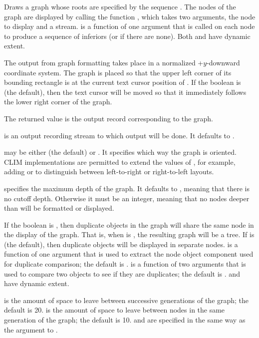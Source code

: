 Draws a graph whose roots are specified by the sequence .  The
nodes of the graph are displayed by calling the function ,
which takes two arguments, the node to display and a stream.
 is a function of one argument that is called on each
node to produce a sequence of inferiors (or  if there are none).  Both
 and  have dynamic extent.

The output from graph formatting takes place in a normalized +$y$-downward
coordinate system.  The graph is placed so that the upper left corner of its
bounding rectangle is at the current text cursor position of .  If
the boolean  is  (the default), then the text cursor
will be moved so that it immediately follows the lower right corner of the
graph.

The returned value is the output record corresponding to the graph.

 is an output recording stream to which output will be done.  It
defaults to .

 may be either  (the default) or
.  It specifies which way the graph is oriented.  CLIM
implementations are permitted to extend the values of , for
example, adding  or  to distinguish between left-to-right
or right-to-left layouts.

 specifies the maximum depth of the graph.  It defaults to
, meaning that there is no cutoff depth.  Otherwise it must be an
integer, meaning that no nodes deeper than  will be formatted
or displayed.

If the boolean  is , then duplicate objects in
the graph will share the same node in the display of the graph.  That is, when
 is , the resulting graph will be a tree.  If
 is  (the default), then duplicate objects
will be displayed in separate nodes.   is a function of one
argument that is used to extract the node object component used for duplicate
comparison; the default is .   is a function of
two arguments that is used to compare two objects to see if they are duplicates;
the default is .   and  have
dynamic extent.

 is the amount of space to leave between successive
generations of the graph; the default is 20.  
is the amount of space to leave between nodes in the same generation of the
graph; the default is 10.   and
 are specified in the same way as the
 argument to .

